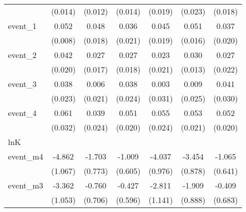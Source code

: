 {\begin{tabular}{l*{6}{c}}
            &     (0.014)         &     (0.012)         &     (0.014)         &     (0.019)         &     (0.023)         &     (0.018)         \\
[1em]
event\_1     &       0.052\sym{***}&       0.048\sym{**} &       0.036         &       0.045\sym{*}  &       0.051\sym{**} &       0.037         \\
            &     (0.008)         &     (0.018)         &     (0.021)         &     (0.019)         &     (0.016)         &     (0.020)         \\
[1em]
event\_2     &       0.042\sym{*}  &       0.027         &       0.027         &       0.023         &       0.030\sym{*}  &       0.027         \\
            &     (0.020)         &     (0.017)         &     (0.018)         &     (0.021)         &     (0.013)         &     (0.022)         \\
[1em]
event\_3     &       0.038         &       0.006         &       0.038         &       0.003         &       0.009         &       0.041         \\
            &     (0.023)         &     (0.021)         &     (0.024)         &     (0.031)         &     (0.025)         &     (0.030)         \\
[1em]
event\_4     &       0.061         &       0.039         &       0.051\sym{*}  &       0.055\sym{*}  &       0.053\sym{*}  &       0.052\sym{**} \\
            &     (0.032)         &     (0.024)         &     (0.020)         &     (0.024)         &     (0.021)         &     (0.020)         \\
\hline
lnK         &                     &                     &                     &                     &                     &                     \\
event\_m4    &      -4.862\sym{***}&      -1.703\sym{*}  &      -1.009         &      -4.037\sym{***}&      -3.454\sym{***}&      -1.065         \\
            &     (1.067)         &     (0.773)         &     (0.605)         &     (0.976)         &     (0.878)         &     (0.641)         \\
[1em]
event\_m3    &      -3.362\sym{**} &      -0.760         &      -0.427         &      -2.811\sym{*}  &      -1.909\sym{*}  &      -0.409         \\
            &     (1.053)         &     (0.706)         &     (0.596)         &     (1.141)         &     (0.888)         &     (0.683)         \\

\end{tabular}}

